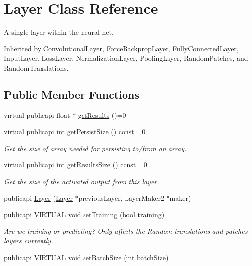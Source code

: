 \hypertarget{classLayer}{\section{Layer Class Reference}
\label{classLayer}
}


A single layer within the neural net.  




Inherited by Convolutional\-Layer, Force\-Backprop\-Layer, Fully\-Connected\-Layer, Input\-Layer, Loss\-Layer, Normalization\-Layer, Pooling\-Layer, Random\-Patches, and Random\-Translations.

\subsection*{Public Member Functions}
\begin{DoxyCompactItemize}
\item 
virtual publicapi float $\ast$ \hyperlink{classLayer_ae9068e8ff8f6d8d50412aa82014562a7}{get\-Results} ()=0
\item 
virtual publicapi int \hyperlink{classLayer_a8ad13f9abd9accb3577cec64172c3cfa}{get\-Persist\-Size} () const =0
\begin{DoxyCompactList}\small\item\em Get the size of array needed for persisting to/from an array. \end{DoxyCompactList}\item 
virtual publicapi int \hyperlink{classLayer_a4e3adf4750ce49ec64df0ed13425cde9}{get\-Results\-Size} () const =0
\begin{DoxyCompactList}\small\item\em Get the size of the activated output from this layer. \end{DoxyCompactList}\item 
publicapi \hyperlink{classLayer_af8926e30054e50a5c7d1b29a8be05164}{Layer} (\hyperlink{classLayer}{Layer} $\ast$previous\-Layer, Layer\-Maker2 $\ast$maker)
\item 
publicapi V\-I\-R\-T\-U\-A\-L void \hyperlink{classLayer_ae4347df6631ca9af22de31d3d1c1273d}{set\-Training} (bool training)
\begin{DoxyCompactList}\small\item\em Are we training or predicting? Only affects the Random translations and patches layers currently. \end{DoxyCompactList}\item 
publicapi V\-I\-R\-T\-U\-A\-L void \hyperlink{classLayer_a9779cba6c042648fcce1c605e4bed3b8}{set\-Batch\-Size} (int batch\-Size)

\end{DoxyCompactItemize}
